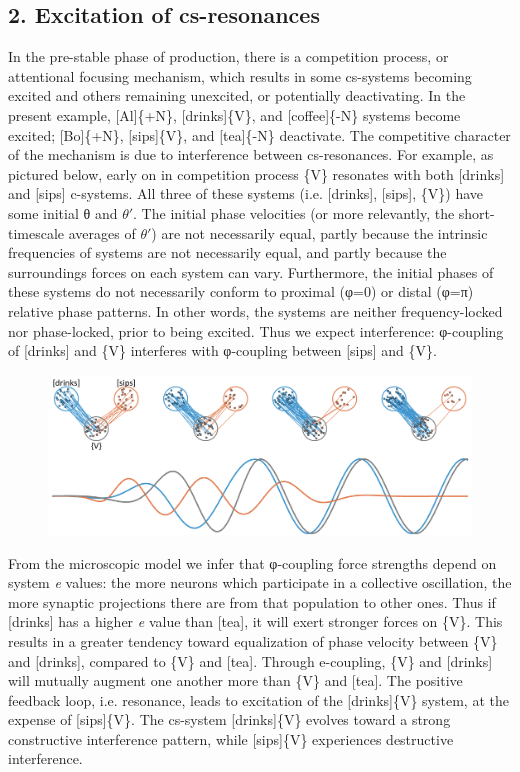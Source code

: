 \subsection{2. Excitation of cs-resonances}

In the pre-stable phase of production, there is a competition process, or attentional focusing mechanism, which results in some cs-systems becoming excited and others remaining unexcited, or potentially deactivating. In the present example, [Al]\{+N\}, [drinks]\{V\}, and [coffee]\{-N\} systems become excited; [Bo]\{+N\}, [sips]\{V\}, and [tea]\{-N\} deactivate. The competitive character of the mechanism is due to interference between cs-resonances. For example, as pictured below, early on in competition process \{V\} resonates with both [drinks] and [sips] c-systems. All three of these systems (i.e. [drinks], [sips], \{V\}) have some initial θ and $\theta ′$. The initial phase velocities (or more relevantly, the short-timescale averages of $\theta ′$) are not necessarily equal, partly because the intrinsic frequencies of systems are not necessarily equal, and partly because the surroundings forces on each system can vary. Furthermore, the initial phases of these systems do not necessarily conform to proximal (φ=0) or distal (φ=π) relative phase patterns. In other words, the systems are neither frequency-locked nor phase-locked, prior to being excited. Thus we expect interference: φ{}-coupling of [drinks] and \{V\} interferes with φ{}-coupling between [sips] and \{V\}.

  
\begin{figure}
\includegraphics[width=\textwidth]{figures/Tilsen-img52.png}
\caption{\missingcaption}
\label{fig:}
\end{figure}
 

  From the microscopic model we infer that φ{}-coupling force strengths depend on system \textit{e} values: the more neurons which participate in a collective oscillation, the more synaptic projections there are from that population to other ones. Thus if [drinks] has a higher \textit{e} value than [tea], it will exert stronger forces on \{V\}. This results in a greater tendency toward equalization of phase velocity between \{V\} and [drinks], compared to \{V\} and [tea]. Through e-coupling, \{V\} and [drinks] will mutually augment one another more than \{V\} and [tea]. The positive feedback loop, i.e. resonance, leads to excitation of the [drinks]\{V\} system, at the expense of [sips]\{V\}. The cs-system [drinks]\{V\} evolves toward a strong constructive interference pattern, while [sips]\{V\} experiences destructive interference.

